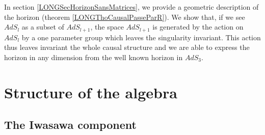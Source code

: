 In section \ref{LONGSecHorizonSansMatrices}, we provide a geometric description of the horizon (theorem \ref{LONGThoCausalPasseParR}). We show that, if we see $AdS_l$ as a subset of $AdS_{l+1}$, the space $AdS_{l+1}$ is generated by the action on $AdS_l$ by a one parameter group which leaves the singularity invariant. This action thus leaves invariant the whole causal structure and we are able to express the horizon in any dimension from the well known horizon in $AdS_3$.
%
\section{Structure of the algebra}
%
\label{LONGSecProgressRidMatrices}

%
\subsection{The Iwasawa component}
%

